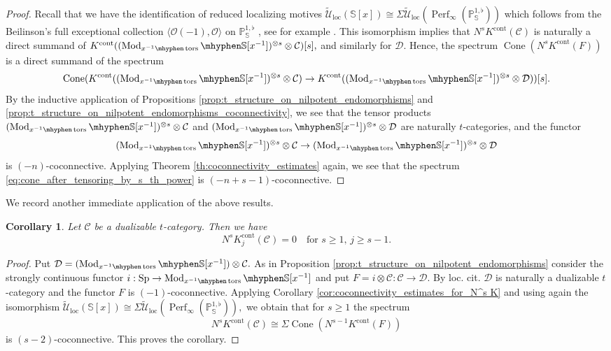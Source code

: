 \documentclass[11pt,leqno]{amsart}
\newtheorem{cor}[theo]{Corollary}
\numberwithin{equation}{section}
\def\bS{\mathbb{S}}
\def\wt{\widetilde}
\def\PP{{\mathbb P}}
\newcommand{\hy}{\mhyphen}
\newcommand{\Cone}{\operatorname{Cone}}
\newcommand{\loc}{\operatorname{loc}}
\newcommand{\cont}{\operatorname{cont}}
\newcommand{\cO}{{\mathcal O}}
\newcommand{\cD}{{\mathcal D}}
\newcommand{\cC}{{\mathcal C}}
\newcommand{\cU}{{\mathcal U}}
\newcommand{\la}{\langle}
\newcommand{\ra}{\rangle}
\newcommand{\Perf}{\operatorname{Perf}}
\newcommand{\Sp}{\operatorname{Sp}}
\newcommand{\tors}{\operatorname{tors}}
\newcommand{\Mod}{\operatorname{Mod}}
\begin{document}
\begin{proof}
	Recall that we have the identification of reduced localizing motives $\wt{\cU}_{\loc}(\bS[x])\cong \Sigma \wt{\cU}_{\loc}(\Perf_{\infty}(\PP_{\bS}^{1,\flat}))$ which follows from the Beilinson's full exceptional collection $\la\cO(-1),\cO \ra$ on $\PP_{\bS}^{1,\flat}$ \cite{Bei78}, see for example \cite[Proof of Theorem 9.1]{E25c}. This isomorphism implies that $N^s K^{\cont}(\cC)$ is naturally a direct summand of $K^{\cont}((\Mod_{x^{-1}\hy\tors}\hy \bS[x^{-1}])^{\otimes s}\otimes \cC)[s],$ and similarly for $\cD.$ Hence, the spectrum $\Cone(N^s K^{\cont}(F))$ is a direct summand of the spectrum
	\begin{equation}\label{eq:cone_after_tensoring_by_s_th_power}
		\Cone(K^{\cont}((\Mod_{x^{-1}\hy\tors}\hy \bS[x^{-1}])^{\otimes s}\otimes \cC)\to K^{\cont}((\Mod_{x^{-1}\hy\tors}\hy \bS[x^{-1}])^{\otimes s}\otimes \cD))[s].
	\end{equation}
	By the inductive application of Propositions \ref{prop:t_structure_on_nilpotent_endomorphisms} and \ref{prop:t_structure_on_nilpotent_endomorphisms_coconnectivity}, we see that the tensor products $(\Mod_{x^{-1}\hy\tors}\hy \bS[x^{-1}])^{\otimes s}\otimes \cC$ and $(\Mod_{x^{-1}\hy\tors}\hy \bS[x^{-1}])^{\otimes s}\otimes \cD$ are naturally $t$-categories, and the functor
	\begin{equation*}
		(\Mod_{x^{-1}\hy\tors}\hy \bS[x^{-1}])^{\otimes s}\otimes \cC\to (\Mod_{x^{-1}\hy\tors}\hy \bS[x^{-1}])^{\otimes s}\otimes \cD
	\end{equation*}
	is $(-n)$-coconnective. Applying Theorem \ref{th:coconnectivity_estimates} again, we see that the spectrum \eqref{eq:cone_after_tensoring_by_s_th_power} is $(-n+s-1)$-coconnective. 
\end{proof}

We record another immediate application of the above results.

\begin{cor}\label{cor:coconnectivity_for_N^sK_of_t_categories}
Let $\cC$ be a dualizable $t$-category. Then we have
\begin{equation*}
N^s K_j^{\cont}(\cC) = 0\quad\text{for }s\geq 1,\,j\geq s-1.
\end{equation*}
\end{cor}

\begin{proof}
Put $\cD = (\Mod_{x^{-1}\hy\tors}\hy\bS[x^{-1}])\otimes \cC.$ As in Proposition \ref{prop:t_structure_on_nilpotent_endomorphisms} consider the strongly continuous functor $i:\Sp\to\Mod_{x^{-1}\hy\tors}\hy\bS[x^{-1}]$ and put $F=i\otimes\cC:\cC\to\cD.$ By loc. cit. $\cD$ is naturally a dualizable $t$-category and the functor $F$ is $(-1)$-coconnective. Applying Corollary \ref{cor:coconnectivity_estimates_for_N^s K} and using again the isomorphism $\wt{\cU}_{\loc}(\bS[x])\cong \Sigma \wt{\cU}_{\loc}(\Perf_{\infty}(\PP_{\bS}^{1,\flat})),$ we obtain that for $s\geq 1$ the spectrum
\begin{equation*}
N^s K^{\cont}(\cC)\cong \Sigma\Cone(N^{s-1}K^{\cont}(F))
\end{equation*}
is $(s-2)$-coconnective. This proves the corollary.
\end{proof}
\end{document}
